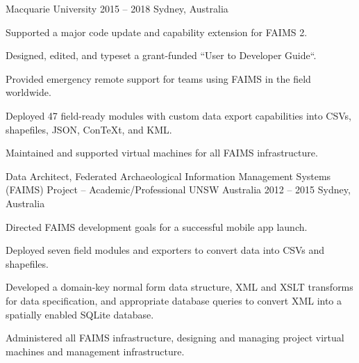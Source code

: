 \begin{cventries}
    {Macquarie University} %
    {2015 -- 2018} %
    {Sydney, Australia} %
    {\begin{cvitems}%
    \item {Supported a major code update and capability extension for FAIMS 2.}
    \item {Designed, edited, and typeset a grant-funded ``User to Developer Guide``.}
    \item {Provided emergency remote support for teams using FAIMS in the field worldwide.}
    \item {Deployed 47 field-ready modules with custom data export capabilities into CSVs, shapefiles, JSON, Con\TeX{}t, and KML.}
    \item {Maintained and supported virtual machines for all FAIMS infrastructure.}
\end{cvitems}}
 
\cventry
    {Data Architect, Federated Archaeological Information Management Systems (FAIMS) Project -- Academic/Professional} %
    {UNSW Australia} %
    {2012 -- 2015} %
    {Sydney, Australia} %
    {\begin{cvitems}%
    \item {Directed FAIMS development goals for a successful mobile app launch.}
    \item {Deployed seven field modules and exporters to convert data into CSVs and shapefiles.}
    \item {Developed a domain-key normal form data structure, XML and XSLT transforms for data specification, and appropriate database queries to convert XML into a spatially enabled SQLite database.}
    \item {Administered all FAIMS infrastructure, designing and managing project virtual machines and management infrastructure.}
    \end{cvitems}}   




\end{cventries}
